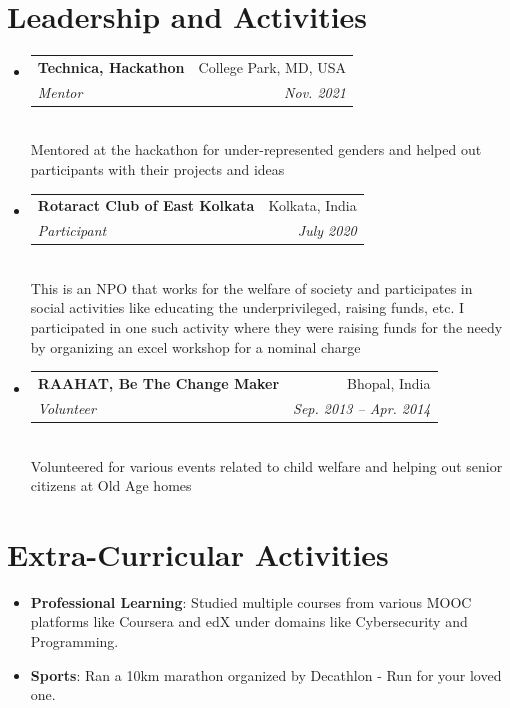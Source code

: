 \documentclass[letterpaper,11pt]{article}
\makeatletter
\newcommand{\resumeSubheading}[4]{
  \vspace{-2pt}\item
    \begin{tabular*}{0.97\textwidth}[t]{l@{\extracolsep{\fill}}r}
      \textbf{#1} & #2 \\
      \textit{\small#3} & \textit{\small #4} \\
    \end{tabular*}\vspace{-7pt}
}
\newcommand{\resumeSubHeadingListStart}{\begin{itemize}[leftmargin=0.15in, label={}]}
\newcommand{\resumeSubHeadingListEnd}{\end{itemize}}
\makeatother
\begin{document}
\section{Leadership and Activities}
 \resumeSubHeadingListStart
  \resumeSubheading
     {Technica, Hackathon}{College Park, MD, USA}
     {Mentor}{Nov. 2021} \vspace{2px} \\
     {Mentored at the hackathon for under-represented genders and helped out participants with their projects and ideas}
  \resumeSubheading
     {Rotaract Club of East Kolkata}{Kolkata, India}
     {Participant}{July 2020} \vspace{2px} \\
     {This is an NPO that works for the welfare of society and participates in social activities like educating the underprivileged, raising funds, etc. I participated in one such activity where they were raising funds for the needy by organizing an excel workshop for a nominal charge}
  \resumeSubheading
     {RAAHAT, Be The Change Maker}{Bhopal, India}
     {Volunteer}{Sep. 2013 -- Apr. 2014} \vspace{2px} \\
     {Volunteered for various events related to child welfare and helping out senior citizens at Old Age homes}
 \resumeSubHeadingListEnd

\section{Extra-Curricular Activities}
 \begin{itemize}
     \item { \textbf {Professional Learning}{: Studied multiple courses from various MOOC platforms like Coursera and edX under domains like Cybersecurity and Programming.}}
     \item {\textbf {Sports}{: Ran a 10km marathon organized by Decathlon - Run for your loved one.}}
 \end{itemize}

\end{document}
